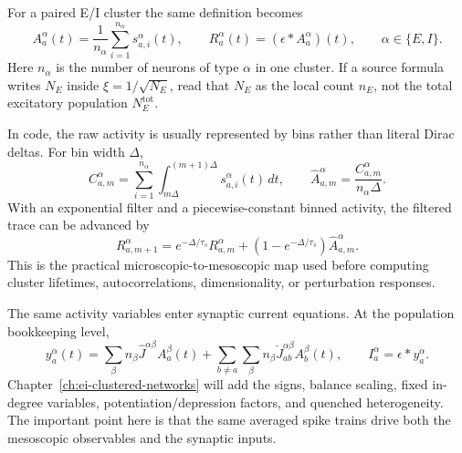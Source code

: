 \noindent For a paired E/I cluster the same definition becomes
%
\begin{equation}
  A_a^\alpha(t)
  =
  \frac{1}{n_\alpha}
  \sum_{i=1}^{n_\alpha}s_{a,i}^\alpha(t),
  \qquad
  R_a^\alpha(t)
  =
  (\epsilon*A_a^\alpha)(t),
  \qquad
  \alpha\in\{E,I\}.
  \label{eq:ch03-cluster-activity-rate}
\end{equation}
%
Here \(n_\alpha\) is the number of neurons of type \(\alpha\) in one cluster.
If a source formula writes \(N_E\) inside \(\xi=1/\sqrt{N_E}\), read that
\(N_E\) as the local count \(n_E\), not the total excitatory population
\(N_E^{\mathrm{tot}}\).

In code, the raw activity is usually represented by bins rather than literal
Dirac deltas. For bin width \(\Delta\),
%
\begin{equation}
  C_{a,m}^\alpha
  =
  \sum_{i=1}^{n_\alpha}
  \int_{m\Delta}^{(m+1)\Delta}
  s_{a,i}^\alpha(t)\,dt,
  \qquad
  \widehat A_{a,m}^\alpha
  =
  \frac{C_{a,m}^\alpha}{n_\alpha\Delta}.
  \label{eq:ch03-binned-cluster-activity}
\end{equation}
%
With an exponential filter and a piecewise-constant binned activity, the
filtered trace can be advanced by
%
\begin{equation}
  R_{a,m+1}^\alpha
  =
  e^{-\Delta/\tau_s}R_{a,m}^\alpha
  +
  \left(1-e^{-\Delta/\tau_s}\right)
  \widehat A_{a,m}^\alpha.
  \label{eq:ch03-filter-recursion}
\end{equation}
%
This is the practical microscopic-to-mesoscopic map used before computing
cluster lifetimes, autocorrelations, dimensionality, or perturbation
responses.

The same activity variables enter synaptic current equations. At the population
bookkeeping level,
%
\begin{equation}
  y_a^\alpha(t)
  =
  \sum_{\beta}
  n_\beta\widehat J^{\alpha\beta}A_a^\beta(t)
  +
  \sum_{b\ne a}\sum_{\beta}
  n_\beta\check J_{ab}^{\alpha\beta}A_b^\beta(t),
  \qquad
  I_a^\alpha=\epsilon*y_a^\alpha.
  \label{eq:ch03-population-input-map}
\end{equation}
%
Chapter~\ref{ch:ei-clustered-networks} will add the signs, balance scaling,
fixed in-degree variables, potentiation/depression factors, and quenched
heterogeneity. The important point here is that the same averaged spike trains
drive both the mesoscopic observables and the synaptic inputs.

